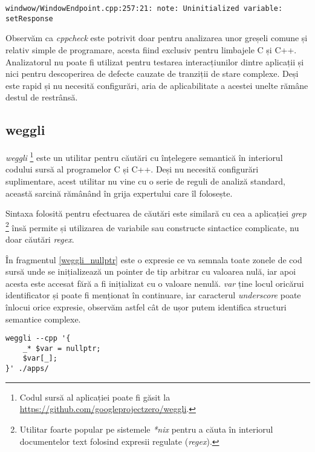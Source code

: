 \begin{lstlisting}[caption={Exemplu de fals pozitiv detectat de \textit{cppcheck}}, label={fals_pozitive_cppcheck}]
windwow/WindowEndpoint.cpp:257:21: note: Uninitialized variable: setResponse
\end{lstlisting}

Observăm ca \textit{cppcheck} este potrivit doar pentru analizarea unor greșeli comune și relativ simple de programare, acesta fiind exclusiv pentru limbajele C și C++. Analizatorul nu poate fi utilizat pentru testarea interacțiunilor dintre aplicații și nici pentru descoperirea de defecte cauzate de tranziții de stare complexe. Deși este rapid și nu necesită configurări, aria de aplicabilitate a acestei unelte rămâne destul de restrânsă.

\subsection*{weggli}

\textit{weggli} \footnote{Codul sursă al aplicației poate fi găsit la \url{https://github.com/googleprojectzero/weggli}.} este un utilitar pentru căutări cu înțelegere semantică în interiorul codului sursă al programelor C și C++. Deși nu necesită configurări suplimentare, acest utilitar nu vine cu o serie de reguli de analiză standard, această sarcină rămânând în grija expertului care îl folosește.

Sintaxa folosită pentru efectuarea de căutări este similară cu cea a aplicației \textit{grep} \footnote{Utilitar foarte popular pe sistemele \textit{*nix} pentru a căuta în interiorul documentelor text folosind expresii regulate (\textit{regex}).} însă permite și utilizarea de variabile sau constructe sintactice complicate, nu doar căutări \textit{regex}.

În fragmentul \ref{weggli_nullptr} este o expresie ce va semnala toate zonele de cod sursă unde se inițializează un pointer de tip arbitrar cu valoarea nulă, iar apoi acesta este accesat fără a fi inițializat cu o valoare nenulă. \textit{var} ține locul oricărui identificator și poate fi menționat în continuare, iar caracterul \textit{underscore} poate înlocui orice expresie, observăm astfel cât de ușor putem identifica structuri semantice complexe.

\begin{lstlisting}[label={weggli_nullptr}, caption={Interogare weggli pentru a găsi accesări de pointer nul}]
weggli --cpp '{
    _* $var = nullptr;
    $var[_];
}' ./apps/
\end{lstlisting}

